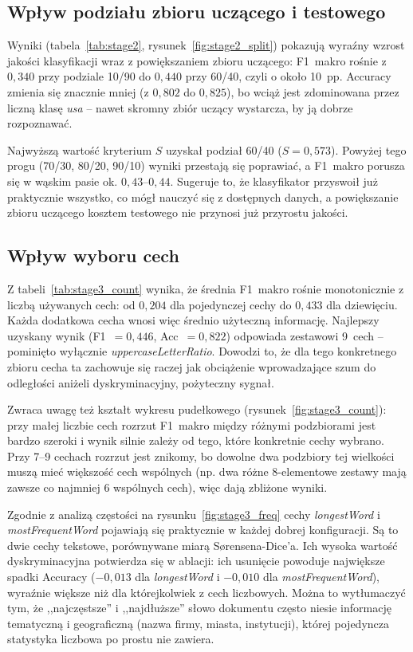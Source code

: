 \documentclass{article}
\begin{document}
\subsection{Wpływ podziału zbioru uczącego i testowego}

Wyniki (tabela~\ref{tab:stage2}, rysunek~\ref{fig:stage2_split}) pokazują
wyraźny wzrost jakości klasyfikacji wraz z powiększaniem zbioru uczącego:
F1~makro rośnie z $0{,}340$ przy podziale 10/90 do $0{,}440$ przy 60/40, czyli
o około 10~pp. Accuracy zmienia się znacznie mniej (z $0{,}802$ do $0{,}825$),
bo wciąż jest zdominowana przez liczną klasę \textit{usa} -- nawet skromny
zbiór uczący wystarcza, by ją dobrze rozpoznawać.

Najwyższą wartość kryterium $S$ uzyskał podział 60/40 ($S=0{,}573$). Powyżej
tego progu (70/30, 80/20, 90/10) wyniki przestają się poprawiać, a F1~makro
porusza się w wąskim pasie ok. $0{,}43$--$0{,}44$. Sugeruje to, że klasyfikator
przyswoił już praktycznie wszystko, co mógł nauczyć się z dostępnych danych,
a powiększanie zbioru uczącego kosztem testowego nie przynosi już przyrostu
jakości.

\subsection{Wpływ wyboru cech}

Z tabeli~\ref{tab:stage3_count} wynika, że średnia F1~makro rośnie monotonicznie
z liczbą używanych cech: od $0{,}204$ dla pojedynczej cechy do $0{,}433$ dla
dziewięciu. Każda dodatkowa cecha wnosi więc średnio użyteczną informację.
Najlepszy uzyskany wynik (F1~$=0{,}446$, Acc~$=0{,}822$) odpowiada zestawowi
9~cech -- pominięto wyłącznie \textit{uppercaseLetterRatio}. Dowodzi to,
że dla tego konkretnego zbioru cecha ta zachowuje się raczej jak obciążenie
wprowadzające szum do odległości aniżeli dyskryminacyjny, pożyteczny sygnał.

Zwraca uwagę też kształt wykresu pudełkowego (rysunek~\ref{fig:stage3_count}):
przy małej liczbie cech rozrzut F1~makro między różnymi podzbiorami jest bardzo
szeroki i wynik silnie zależy od tego, które konkretnie cechy wybrano. Przy 7--9
cechach rozrzut jest znikomy, bo dowolne dwa podzbiory tej wielkości muszą mieć
większość cech wspólnych (np. dwa różne 8-elementowe zestawy mają zawsze co
najmniej 6 wspólnych cech), więc dają zbliżone wyniki.

Zgodnie z analizą częstości na rysunku~\ref{fig:stage3_freq} cechy
\textit{longestWord} i \textit{mostFrequentWord} pojawiają się praktycznie
w każdej dobrej konfiguracji. Są to dwie cechy tekstowe, porównywane miarą
Sørensena-Dice'a. Ich wysoka wartość dyskryminacyjna potwierdza się w ablacji:
ich usunięcie powoduje największe spadki Accuracy ($-0{,}013$ dla
\textit{longestWord} i $-0{,}010$ dla \textit{mostFrequentWord}), wyraźnie
większe niż dla którejkolwiek z cech liczbowych. Można to wytłumaczyć tym, że
,,najczęstsze'' i ,,najdłuższe'' słowo dokumentu często niesie informację
tematyczną i geograficzną (nazwa firmy, miasta, instytucji), której pojedyncza
statystyka liczbowa po prostu nie zawiera.
\end{document}
